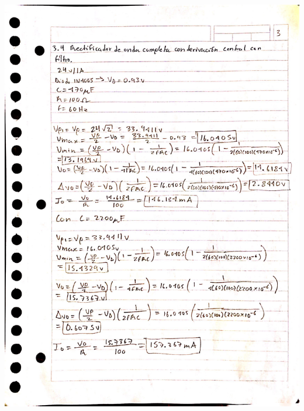 \documentclass[12pt]{article}
\begin{document}
\begin{itemize}
\begin{center}
            \includegraphics*[scale=0.2]{an3.jpg}

\end{center}
\end{itemize}
\end{document}
